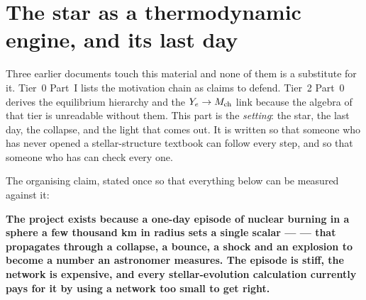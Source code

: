 %
%

\section{The star as a thermodynamic engine, and its last day}
\label{part:engine}

Three earlier documents touch this material and none of them is a substitute for
it. Tier~0 Part~I lists the motivation chain as claims to defend. Tier~2 Part~0
derives the equilibrium hierarchy and the $Y_{e} \to M_{\mathrm{ch}}$ link because the
algebra of that tier is unreadable without them. This part is the
\emph{setting}: the star, the last day, the collapse, and the light that comes
out. It is written so that someone who has never opened a stellar-structure
textbook can follow every step, and so that someone who has can check every one.

The organising claim, stated once so that everything below can be measured
against it:

\begin{invariant}
\textbf{The project exists because a one-day episode of nuclear burning in a
sphere a few thousand km in radius sets a single scalar --- \Ye{} --- that
propagates through a collapse, a bounce, a shock and an explosion to become a
number an astronomer measures. The episode is stiff, the network is expensive,
and every stellar-evolution calculation currently pays for it by using a
network too small to get \Ye{} right.}
\end{invariant}

